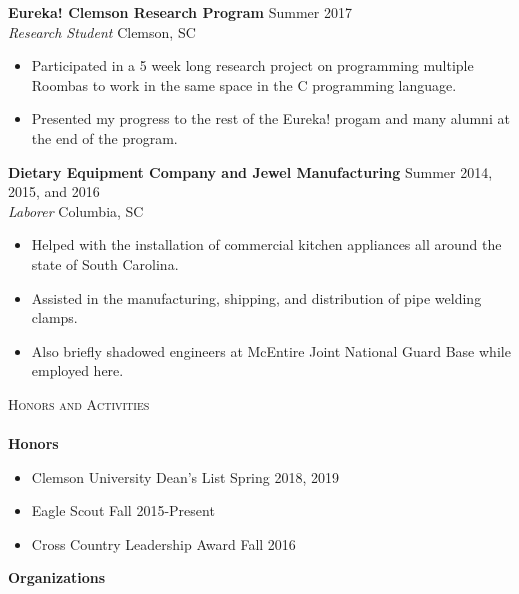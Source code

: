 \documentclass[a4paper]{article}
\newcommand{\lineunder} {
    \vspace*{-8pt} \\
    \hspace*{-18pt} \hrulefill \\
}
\newcommand{\header} [1] {
    {\hspace*{-18pt}\vspace*{6pt} \textsc{#1}}
    \vspace*{-6pt} \lineunder
}
\newcommand{\beginninglist} [4] {
	
	\noindent \textbf{#1} \hfill \hfill #3\\ \noindent \textit{#2} \hfill \hfill #4 \\    
}
\begin{document}
\beginninglist {Eureka! Clemson Research Program} {Research Student} {Summer 2017} {Clemson, SC}
\vspace{-8pt}
\begin{itemize}
	\item Participated in a 5 week long research project on programming multiple Roombas to work in the same space in the C programming language.  \vspace{-5pt}
	\item Presented my progress to the rest of the Eureka! progam and many alumni at the end of the program. \vspace{-5pt}
\end{itemize}
\beginninglist {Dietary Equipment Company and Jewel Manufacturing} {Laborer} {Summer 2014, 2015, and 2016} {Columbia, SC} \vspace{-8pt}
\begin{itemize}
	\item Helped with the installation of commercial kitchen appliances all around the state of South Carolina.\vspace{-5pt}
	\item Assisted in the manufacturing, shipping, and distribution of pipe welding clamps. \vspace{-5pt}
	\item Also briefly shadowed engineers at McEntire Joint National Guard Base while employed here. \vspace{-5pt}
\end{itemize}

\header {Honors and Activities}

\textbf{Honors}

\begin{itemize}
\vspace{-10pt}
\item Clemson University Dean's List \hfill \hfill Spring 2018, 2019 \vspace{-5pt} 
\item Eagle Scout \hfill \hfill Fall 2015-Present \vspace{-5pt}
\item Cross Country Leadership Award \hfill \hfill Fall 2016 \vspace{-5pt}
\end{itemize}

\textbf{Organizations} \vspace{-5pt}
\end{document}
